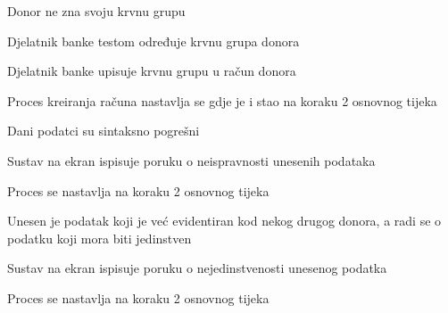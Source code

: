 \begin{packed_item}
\begin{packed_item}
							\item[2.b] Donor ne zna svoju krvnu grupu
                            \begin{packed_enum}
							    \item Djelatnik banke testom određuje krvnu grupa donora
							    \item Djelatnik banke upisuje krvnu grupu u račun donora
							    \item Proces kreiranja računa nastavlja se gdje je i stao na koraku 2 osnovnog tijeka
                            \end{packed_enum}
						
							\item[4.a] Dani podatci su sintaksno pogrešni
							\begin{packed_enum}
								\item Sustav na ekran ispisuje poruku o neispravnosti unesenih podataka
								\item Proces se nastavlja na koraku 2 osnovnog tijeka
							\end{packed_enum}
							
							\item[4.b] Unesen je podatak koji je već evidentiran kod nekog drugog donora, a radi se o podatku koji mora biti jedinstven
							\begin{packed_enum}
								\item Sustav na ekran ispisuje poruku o nejedinstvenosti unesenog podatka
								\item Proces se nastavlja na koraku 2 osnovnog tijeka
							\end{packed_enum}
							
						\end{packed_item}
						
					\end{packed_item}
					
